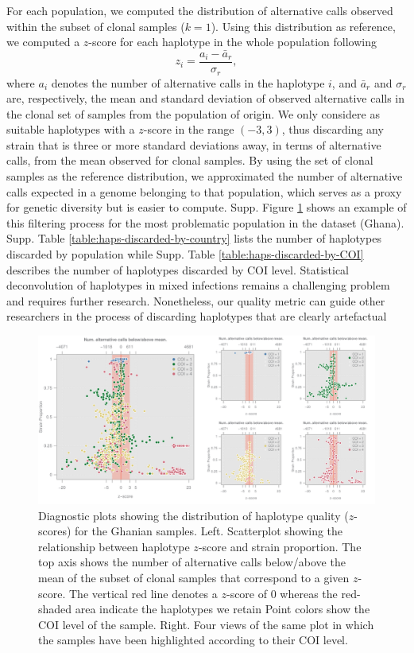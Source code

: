 \documentclass[9pt]{article}
\begin{document}
For each population, we computed the distribution of alternative calls observed within the subset of clonal samples ($k=1$). Using this distribution as reference, we computed a $z$-score for each haplotype in the whole population following $$z_i = \frac{a_i - \bar{a}_r}{\sigma_r},$$ where $a_i$ denotes the number of alternative calls in the haplotype $i$, and $\bar{a}_r$ and $\sigma_r$ are, respectively, the mean and standard deviation of observed alternative calls in the clonal set of samples from the population of origin. We only considere as suitable haplotypes with a $z$-score in the range $(-3,3)$, thus discarding any strain that is three or more standard deviations away, in terms of alternative calls, from the mean observed for clonal samples. By using the set of clonal samples as the reference distribution, we approximated the number of alternative calls expected in a genome belonging to that population, which serves as a proxy for genetic diversity but is easier to compute. Supp. Figure \ref{fig:ghana-filtering} shows an example of this filtering process for the most problematic population in the dataset (Ghana). Supp. Table \ref{table:haps-discarded-by-country} lists the number of haplotypes discarded by population while Supp. Table \ref{table:haps-discarded-by-COI} describes the number of haplotypes discarded by COI level. Statistical deconvolution of haplotypes in mixed infections remains a challenging problem and requires further research. Nonetheless, our quality metric can guide other researchers in the process of discarding haplotypes that are clearly artefactual

\begin{figure}[ht]
  \centering
    \includegraphics[width=1\textwidth]{figures/qualityGhana.pdf}
  \caption{Diagnostic plots showing the distribution of haplotype quality ($z$-scores) for the Ghanian samples. Left. Scatterplot showing the relationship between haplotype $z$-score and strain proportion. The top axis shows the number of alternative calls below/above the mean of the subset of clonal samples that correspond to a given $z$-score. The vertical red line denotes a $z$-score of $0$ whereas the red-shaded area indicate the haplotypes we retain Point colors show the COI level of the sample. Right. Four views of the same plot in which the samples have been highlighted according to their COI level.}
    \label{fig:ghana-filtering}
\end{figure}
\end{document}
